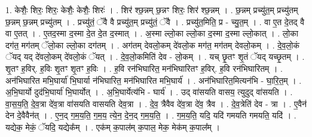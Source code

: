\documentclass[17pt]{extarticle}
\begin{document}
1. केशैः॒ शिरः॒ शिरः॒ केशैः॒ केशैः॒ शिरः॑ । . शिर॑ श्छ॒न्नम् छ॒न्नꣳ शिरः॒ शिर॑ श्छ॒न्नम् । . छ॒न्नम् प्रच्यु॑त॒म् प्रच्यु॑तम् छ॒न्नम् छ॒न्नम् प्रच्यु॑तम् । . प्रच्यु॑तं॒ ॅवै वै प्रच्यु॑त॒म् प्रच्यु॑तं॒ ॅवै । . प्रच्यु॑त॒मिति॒ प्र - च्यु॒त॒म् । . वा ए॒त दे॒तद् वै वा ए॒तत् । . ए॒तद॒स्मा द॒स्मा दे॒त दे॒त द॒स्मात् । . अ॒स्मा ल्लो॒का ल्लो॒का द॒स्मा द॒स्मा ल्लो॒कात् । . लो॒का दग॑त॒ मग॑तम् ॅलो॒का ल्लो॒का दग॑तम् । . अग॑तम् देवलो॒कम् दे॑वलो॒क मग॑त॒ मग॑तम् देवलो॒कम् । . दे॒व॒लो॒कं ॅयद् यद् दे॑वलो॒कम् दे॑वलो॒कं ॅयत् । . दे॒व॒लो॒कमिति॑ देव - लो॒कम् । . यच् छृ॒तꣳ शृ॒तं ॅयद् यच्छृ॒तम् । . शृ॒तꣳ ह॒विर्. ह॒विः शृ॒तꣳ शृ॒तꣳ ह॒विः । . ह॒वि रन॑भिघारित॒ मन॑भिघारितꣳ ह॒विर्. ह॒वि रन॑भिघारितम् । . अन॑भिघारित मभि॒घार्या॑ भि॒घार्या न॑भिघारित॒ मन॑भिघारित मभि॒घार्य॑ । . अन॑भिघारित॒मित्यन॑भि - घा॒रि॒त॒म् । . अ॒भि॒घार्यो दुद॑भि॒घार्या॑ भि॒घार्योत् । . अ॒भि॒घार्येत्य॑भि - घार्य॑ । . उद् वा॑सयति वासय॒ त्युदुद् वा॑सयति । . वा॒स॒य॒ति॒ दे॒व॒त्रा दे॑व॒त्रा वा॑सयति वासयति देव॒त्रा । . दे॒व॒ त्रैवैव दे॑व॒त्रा दे॑व॒ त्रैव । . दे॒व॒त्रेति॑ देव - त्रा । . ए॒वैन॑ देन दे॒वैवैन॑त् । . ए॒न॒द् ग॒म॒य॒ति॒ ग॒म॒य॒ त्ये॒न॒ दे॒न॒द् ग॒म॒य॒ति॒ । . ग॒म॒य॒ति॒ यदि॒ यदि॑ गमयति गमयति॒ यदि॑ । . यद्येक॒ मेकं॒ ॅयदि॒ यद्येक᳚म् । . एक॑म् क॒पाल॑म् क॒पाल॒ मेक॒ मेक॑म् क॒पाल᳚म् । \newline
\end{document}
